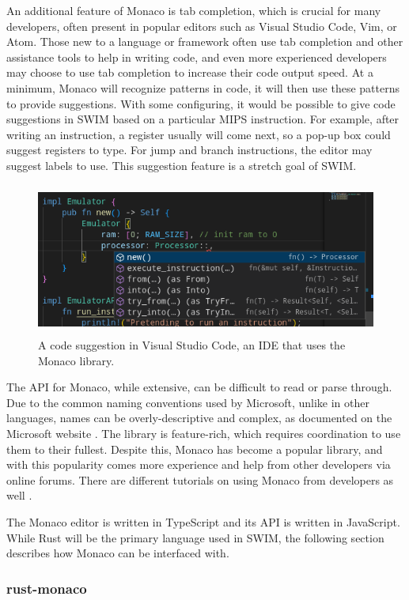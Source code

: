 \documentclass[
    paper=letter,
    parskip=half,
    fontsize=12pt,
    titlepage=firstiscover,
    toc=bibliography,
    numbers=endperiod
]{scrartcl}
\begin{document}
An additional feature of Monaco is tab completion, which is crucial for
many developers, often present in popular editors such as Visual Studio
Code, Vim, or Atom. Those new to a language or framework often use tab
completion and other assistance tools to help in writing code, and even
more experienced developers may choose to use tab completion to increase
their code output speed. At a minimum, Monaco will recognize patterns in
code, it will then use these patterns to provide suggestions. With some
configuring, it would be possible to give code suggestions in SWIM based
on a particular MIPS instruction. For example, after writing an
instruction, a register usually will come next, so a pop-up box could
suggest registers to type. For jump and branch instructions, the editor
may suggest labels to use. This suggestion feature is a stretch goal of
SWIM.

\begin{figure}[H]
    \includegraphics[height=5cm]{monaco-suggestions}
    \caption{A code suggestion in Visual Studio Code, an IDE that uses the Monaco library.}
\end{figure}

The API for Monaco, while extensive, can be difficult to read or parse
through. Due to the common naming conventions used by Microsoft, unlike
in other languages, names can be overly-descriptive and complex, as
documented on the Microsoft website \cite{monaco-api}. The library is
feature-rich, which requires coordination to use them to their fullest.
Despite this, Monaco has become a popular library, and with this
popularity comes more experience and help from other developers via
online forums. There are different tutorials on using Monaco from
developers as well \cite{mishka-monaco, sahoo2018}.

The Monaco editor is written in TypeScript and its API is written in
JavaScript. While Rust will be the primary language used in SWIM, the
following section describes how Monaco can be interfaced with.

\subsubsection{rust-monaco}
\end{document}
